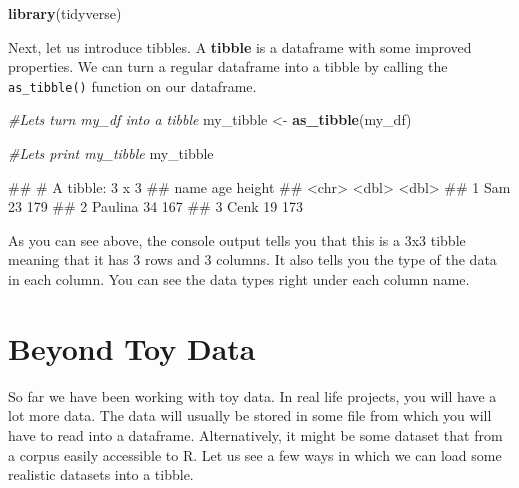 \documentclass[
]{book}
\newenvironment{Shaded}{\begin{snugshade}}{\end{snugshade}}
\newcommand{\CommentTok}[1]{\textcolor[rgb]{0.56,0.35,0.01}{\textit{#1}}}
\newcommand{\FunctionTok}[1]{\textcolor[rgb]{0.13,0.29,0.53}{\textbf{#1}}}
\newcommand{\NormalTok}[1]{#1}
\newcommand{\OtherTok}[1]{\textcolor[rgb]{0.56,0.35,0.01}{#1}}
\begin{document}
\begin{Shaded}
\begin{Highlighting}[]
\FunctionTok{library}\NormalTok{(tidyverse)}
\end{Highlighting}
\end{Shaded}

Next, let us introduce tibbles. A \textbf{tibble} is a dataframe with some improved properties. We can turn a regular dataframe into a tibble by calling the \texttt{as\_tibble()} function on our dataframe.

\begin{Shaded}
\begin{Highlighting}[]
\CommentTok{\#Let\textquotesingle{}s turn my\_df into a tibble}
\NormalTok{my\_tibble }\OtherTok{\textless{}{-}} \FunctionTok{as\_tibble}\NormalTok{(my\_df)}

\CommentTok{\#Let\textquotesingle{}s print my\_tibble}
\NormalTok{my\_tibble}
\end{Highlighting}
\end{Shaded}

\begin{Shaded}
\begin{Highlighting}[]
\NormalTok{\#\# \# A tibble: 3 x 3}
\NormalTok{\#\#   name      age height}
\NormalTok{\#\#   \textless{}chr\textgreater{}   \textless{}dbl\textgreater{}  \textless{}dbl\textgreater{}}
\NormalTok{\#\# 1 Sam        23    179}
\NormalTok{\#\# 2 Paulina    34    167}
\NormalTok{\#\# 3 Cenk       19    173}
\end{Highlighting}
\end{Shaded}

As you can see above, the console output tells you that this is a 3x3 tibble meaning that it has 3 rows and 3 columns. It also tells you the type of the data in each column. You can see the data types right under each column name.

\hypertarget{beyond-toy-data}{%
\section{Beyond Toy Data}\label{beyond-toy-data}}

So far we have been working with toy data. In real life projects, you will have a lot more data. The data will usually be stored in some file from which you will have to read into a dataframe. Alternatively, it might be some dataset that from a corpus easily accessible to R. Let us see a few ways in which we can load some realistic datasets into a tibble.
\end{document}
